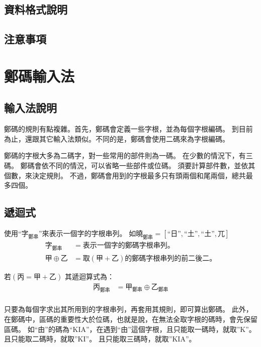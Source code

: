 \documentclass{article}
\newcommand\qhchar[1]{\mbox{#1}}
\newcommand\qhzmlist[1]{\qhchar{#1}_{\mbox{鄭串}}}
\begin{document}
\subsection{資料格式說明}
\subsection{注意事項}

\section{鄭碼輸入法}
\subsection{輸入法說明}
鄭碼的規則有點複雜。首先，鄭碼會定義一些字根，並為每個字根編碼。
到目前為止，還跟其它輸入法類似。不同的是，鄭碼會使用二碼來為字根編碼。

鄭碼的字根大多為二碼字，對一些常用的部件則為一碼。
在少數的情況下，有三碼。
鄭碼會依不同的情況，可以省略一些部件或位碼。
須要計算部件數，並依其個數，來決定規則。
不過，鄭碼會用到的字根最多只有頭兩個和尾兩個，總共最多四個。

\subsection{遞迴式}
使用``$\qhzmlist{字}$''來表示一個字的字根串列。
如$\qhzmlist{曉}=[\qhchar{``日''}, \qhchar{``土''}, \qhchar{``土''}, \qhchar{兀}]$\\

\begin{subequations}
  \begin{align}
    \qhzmlist{字} &= 表示一個字的鄭碼字根串列。\\
    甲 \oplus 乙 &= 取(甲+乙)的鄭碼字根串列的前二後二。
  \end{align}
\end{subequations}

若$(\qhchar{丙}=\qhchar{甲}+\qhchar{乙})$
其遞迴算式為：
\begin{subequations}
  \begin{align}
  \qhzmlist{丙} &= \qhzmlist{甲} \oplus \qhzmlist{乙} \\
  \end{align}
\end{subequations}

只要為每個字求出其所用到的字根串列，再套用其規則，即可算出鄭碼。
此外，在鄭碼中，區碼的重要性大於位碼，也就是說，在無法全取字根的碼時，會先保留區碼。
如``由''的碼為``KIA''，在遇到``由''這個字根，且只能取一碼時，就取''K''。
且只能取二碼時，就取''KI''。
且只能取三碼時，就取''KIA''。
\end{document}
